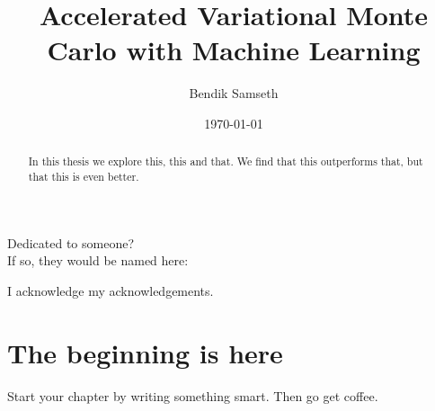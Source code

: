 \documentclass[twoside,english]{uiofysmaster}
\author{Bendik Samseth}
\title{Accelerated Variational Monte Carlo with Machine Learning}
\date{\monthyeardate\today}
\begin{document}
\maketitle

\begin{abstract}
In this thesis we explore this, this and that. We find that this outperforms that, but that this is even better.
\end{abstract}

\begin{dedication}
  Dedicated to someone?
  \\\vspace{12pt}
  If so, they would be named here:
\end{dedication}

\begin{acknowledgements}
  I acknowledge my acknowledgements.
\end{acknowledgements}

\tableofcontents

\chapter{The beginning is here}

Start your chapter by writing something smart. Then go get coffee.
\end{document}
